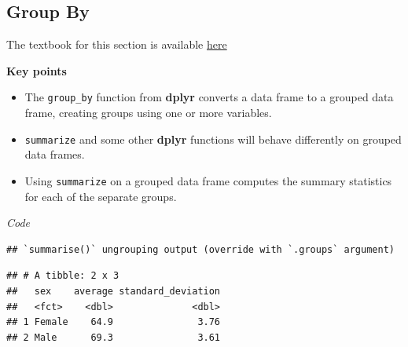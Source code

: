 \documentclass[
]{article}
\newenvironment{Shaded}{\begin{snugshade}}{\end{snugshade}}
\newcommand{\CommentTok}[1]{\textcolor[rgb]{0.56,0.35,0.01}{\textit{#1}}}
\newcommand{\DataTypeTok}[1]{\textcolor[rgb]{0.13,0.29,0.53}{#1}}
\newcommand{\DecValTok}[1]{\textcolor[rgb]{0.00,0.00,0.81}{#1}}
\newcommand{\KeywordTok}[1]{\textcolor[rgb]{0.13,0.29,0.53}{\textbf{#1}}}
\newcommand{\NormalTok}[1]{#1}
\newcommand{\OperatorTok}[1]{\textcolor[rgb]{0.81,0.36,0.00}{\textbf{#1}}}
\newcommand{\StringTok}[1]{\textcolor[rgb]{0.31,0.60,0.02}{#1}}
\providecommand{\tightlist}{%
  \setlength{\itemsep}{0pt}\setlength{\parskip}{0pt}}
\begin{document}
\hypertarget{group-by}{%
\subsection{Group By}\label{group-by}}

The textbook for this section is available
\href{https://rafalab.github.io/dsbook/tidyverse.html\#group-by}{here}

\textbf{Key points}

\begin{itemize}
\tightlist
\item
  The \texttt{group\_by} function from \textbf{dplyr} converts a data
  frame to a grouped data frame, creating groups using one or more
  variables.
\item
  \texttt{summarize} and some other \textbf{dplyr} functions will behave
  differently on grouped data frames.
\item
  Using \texttt{summarize} on a grouped data frame computes the summary
  statistics for each of the separate groups.
\end{itemize}

\emph{Code}

\begin{Shaded}
\end{Shaded}

\begin{verbatim}
## `summarise()` ungrouping output (override with `.groups` argument)
\end{verbatim}

\begin{verbatim}
## # A tibble: 2 x 3
##   sex    average standard_deviation
##   <fct>    <dbl>              <dbl>
## 1 Female    64.9               3.76
## 2 Male      69.3               3.61
\end{verbatim}

\begin{Shaded}
\end{Shaded}
\end{document}
